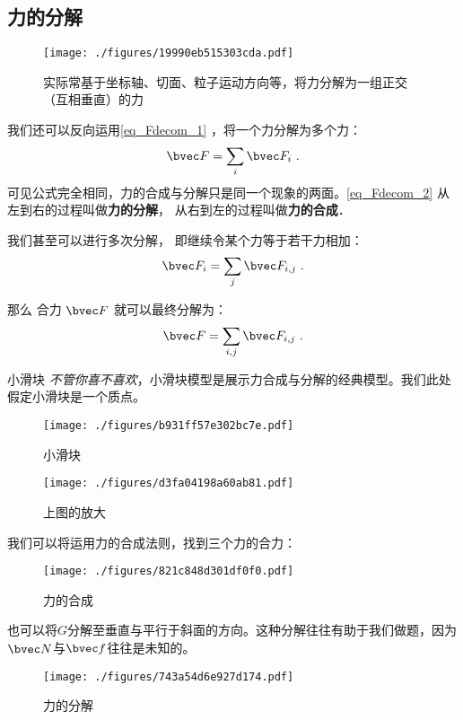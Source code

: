 \subsection{力的分解}
\begin{figure}[ht]
\centering
\texttt{[image: ./figures/19990eb515303cda.pdf]}
\caption{实际常基于坐标轴、切面、粒子运动方向等，将力分解为一组正交（互相垂直）的力} \label{fig_Fdecom_1}
\end{figure}
我们还可以反向运用\autoref{eq_Fdecom_1} ，将一个力分解为多个力：
\begin{equation}\label{eq_Fdecom_2}
\bvec F = \sum_i \bvec F_{i}~.
\end{equation}
可见公式完全相同，力的合成与分解只是同一个现象的两面。\autoref{eq_Fdecom_2} 从左到右的过程叫做\textbf{力的分解}， 从右到左的过程叫做\textbf{力的合成}．

我们甚至可以进行多次分解， 即继续令某个力等于若干力相加：
\begin{equation}
\bvec F_i = \sum_j \bvec F_{i,j}~.
\end{equation}

那么 合力 $\bvec F$ 就可以最终分解为：
\begin{equation}
\bvec F = \sum_{i,j} \bvec F_{i,j}~.
\end{equation}


\begin{example}{小滑块}
\textsl{不管你喜不喜欢}，小滑块模型是展示力合成与分解的经典模型。我们此处假定小滑块是一个质点。
\begin{figure}[ht]
\centering
\texttt{[image: ./figures/b931ff57e302bc7e.pdf]}
\caption{小滑块} \label{fig_Fdecom_4}
\end{figure}

\begin{figure}[ht]
\centering
\texttt{[image: ./figures/d3fa04198a60ab81.pdf]}
\caption{上图的放大} \label{fig_Fdecom_10}
\end{figure}

我们可以将运用力的合成法则，找到三个力的合力：
\begin{figure}[ht]
\centering
\texttt{[image: ./figures/821c848d301df0f0.pdf]}
\caption{力的合成} \label{fig_Fdecom_5}
\end{figure}

也可以将$G$分解至垂直与平行于斜面的方向。这种分解往往有助于我们做题，因为$\bvec N$与$\bvec f$往往是未知的。
\begin{figure}[ht]
\centering
\texttt{[image: ./figures/743a54d6e927d174.pdf]}
\caption{力的分解} \label{fig_Fdecom_6}
\end{figure}

\end{example}

